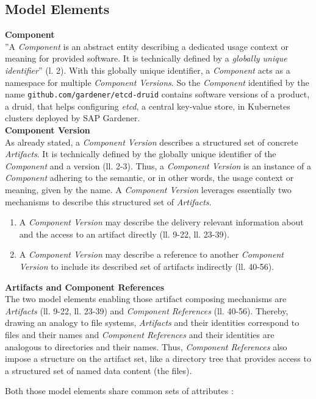 \subsection{Model Elements}

\noindent\textbf{Component}\\
''A \emph{Component} is an abstract entity describing a dedicated usage context or meaning for provided software. It is technically defined by a \emph{globally unique identifier}''\cite{OCMSpec} (l. 2). With this globally unique identifier, a \emph{Component} acts as a namespace for multiple \emph{Component Versions}. So the \emph{Component} identified by the name \lstinline|github.com/gardener/etcd-druid| contains software versions of a product, a druid, that helps configuring \emph{etcd}, a central key-value store, in Kubernetes clusters deployed by SAP Gardener.\\

\noindent\textbf{Component Version}\\
As already stated, a \emph{Component Version} describes a structured set of concrete \emph{Artifacts}. It is technically defined by the globally unique identifier of the \emph{Component} and a version (ll. 2-3). Thus, a \emph{Component Version} is an instance of a \emph{Component} adhering to the semantic, or in other words, the usage context or meaning, given by the name. A \emph{Component Version} leverages essentially two mechanisms to describe this structured set of \emph{Artifacts}. 
\begin{enumerate}
\item A \emph{Component Version} may describe the delivery relevant information about and the access to an artifact directly (ll. 9-22, ll. 23-39).
\item A \emph{Component Version} may describe a reference to another \emph{Component Version} to include its described set of artifacts indirectly (ll. 40-56).
\end{enumerate}

\noindent\textbf{Artifacts and Component References}\\
The two model elements enabling those artifact composing mechanisms are \emph{Artifacts} (ll. 9-22, ll. 23-39) and \emph{Component References} (ll. 40-56). Thereby, drawing an analogy to file systems, \emph{Artifacts} and their identities correspond to files and their names and \emph{Component References} and their identities are analogous to directories and their names. Thus, \emph{Component References} also impose a structure on the artifact set, like a directory tree that provides access to a structured set of named data content (the files).\par
\noindent Both those model elements share common sets of attributes \cite{OCMSpec}:\\

